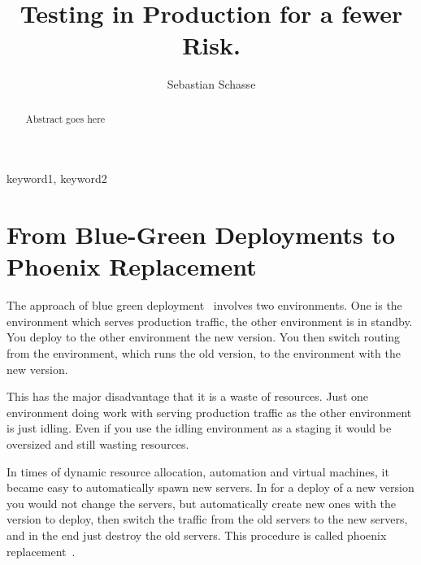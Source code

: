 \documentclass[runningheads,a4paper]{llncs}
\begin{document}
\title{Testing in Production for a fewer Risk.}

\author{Sebastian Schasse}

%
\iffalse
\author{Firstname Lastname\inst{1} \and Firstname Lastname\inst{2} }

\institute{
Insitute 1\\
\email{...}\and
Insitute 2\\
\email{...}
}
\fi

\maketitle

\begin{abstract}
Abstract goes here
\end{abstract}

\begin{keywords}
keyword1, keyword2
\end{keywords}

\section{From Blue-Green Deployments to Phoenix Replacement}

The approach of blue green deployment~\cite[find page]{continuous_delivery} involves two environments. One is the environment which serves production traffic, the other environment is in standby. You deploy to the other environment the new version. You then switch routing from the environment, which runs the old version, to the environment with the new version.

This has the major disadvantage that it is a waste of resources. Just one environment doing work with serving production traffic as the other environment is just idling. Even if you use the idling environment as a staging it would be oversized and still wasting
resources.

In times of dynamic resource allocation, automation and virtual machines, it became easy to automatically spawn new servers. In for a deploy of a new version you would not change the servers, but automatically create new ones with the version to deploy, then switch the traffic from the old servers to the new servers, and in the end just destroy the old servers. This procedure is called phoenix replacement~\cite[p. 283]{infra_as_code}.
\end{document}
